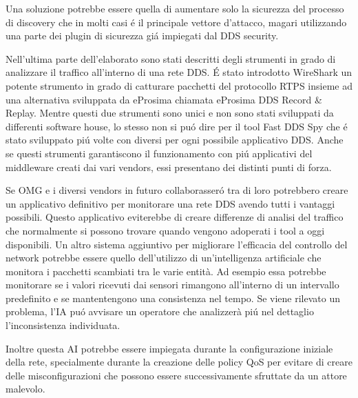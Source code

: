 Una soluzione potrebbe essere quella di aumentare solo la sicurezza del 
processo di discovery che in molti casi é il 
principale vettore d'attacco, magari 
utilizzando una parte dei plugin di sicurezza giá impiegati dal DDS security.

Nell'ultima parte dell'elaborato sono stati descritti degli strumenti 
in grado di analizzare il traffico all'interno di una rete DDS.
É stato introdotto WireShark un potente strumento in grado di 
catturare pacchetti del protocollo RTPS insieme ad una alternativa
sviluppata da eProsima chiamata eProsima DDS Record \&
Replay. Mentre questi due strumenti sono unici e non sono stati 
sviluppati da differenti software house, lo stesso non 
si puó dire per il tool Fast DDS Spy che é stato sviluppato 
piú volte con diversi per ogni possibile 
applicativo DDS.
Anche se questi strumenti garantiscono il funzionamento 
con piú applicativi del middleware creati dai vari vendors, essi
presentano dei distinti punti di forza. 

Se OMG e i diversi vendors in futuro collaborasseró tra di loro 
potrebbero creare un applicativo definitivo per monitorare 
una rete DDS avendo tutti i vantaggi possibili. Questo applicativo 
eviterebbe di creare differenze di analisi del
traffico che normalmente 
si possono trovare quando vengono adoperati i tool a oggi 
disponibili.
Un altro sistema aggiuntivo per migliorare l'efficacia del 
controllo del network potrebbe essere quello 
dell'utilizzo di un'intelligenza artificiale che monitora 
i pacchetti scambiati tra le varie entità. 
Ad esempio essa potrebbe monitorare se i valori ricevuti dai sensori 
rimangono all'interno di un intervallo predefinito e se 
mantentengono una consistenza nel tempo. Se viene rilevato 
un problema, l'IA puó avvisare un operatore che 
analizzerà piú nel dettaglio l'inconsistenza individuata.

Inoltre questa AI potrebbe 
essere impiegata durante la configurazione iniziale della rete,
specialmente durante la creazione delle policy QoS per evitare
di creare delle misconfigurazioni che possono essere
successivamente sfruttate da un attore malevolo.

